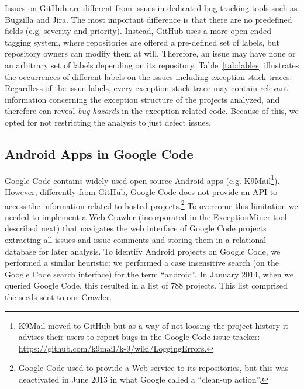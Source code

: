 Issues on GitHub are different from issues in dedicated bug tracking tools such as
Bugzilla and Jira. The most important difference is that there are no predefined fields
  (e.g. severity and priority). Instead, GitHub uses a more open ended tagging system, where
repositories are offered a pre-defined set of labels, but repository owners can modify
them at will. Therefore, an issue may have none or an arbitrary set of labels depending
on its repository. Table~\ref{tab:lables} illustrates the occurrences of different labels
on the issues including exception stack traces. Regardless of the issue labels, every exception stack
trace may contain relevant information concerning the exception structure of the
projects analyzed, and therefore can reveal \emph{bug hazards} in the exception-related code.
Because of this, we opted for not restricting the analysis to just defect issues.


\subsection{Android Apps in Google Code}
Google Code contains widely used open-source Android apps (e.g. K9Mail\footnote{K9Mail moved to GitHub but as a way of not loosing the project history it advises their users to report bugs in the Google Code issue tracker: \url{https://github.com/k9mail/k-9/wiki/LoggingErrors.}}).
However, differently from GitHub, Google Code does not provide an API to access the information related
 to hosted projects.\footnote{Google Code used to provide a Web service to its repositories, but this was deactivated in June 2013 in what Google called a ``clean-up action''.}
To overcome this limitation we needed to implement a Web Crawler (incorporated in the ExceptionMiner tool described next) that navigates
 the web interface of Google Code projects extracting all issues and issue comments and storing them in a relational database for later analysis.
To identify Android projects on Google Code, we performed a similar heuristic: we performed a case insensitive search
(on the Google Code search interface) for the term ``android''. In January 2014, when we queried Google Code, this resulted in a list of 788  projects. This list comprised the seeds sent to our Crawler.

